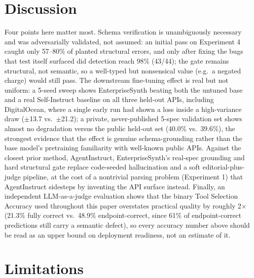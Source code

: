 \documentclass[11pt]{article}
\begin{document}
\section{Discussion}

Four points here matter most. Schema verification is unambiguously necessary and was
adversarially validated, not assumed: an initial pass on Experiment 4 caught only 57--80\% of
planted structural errors, and only after fixing the bugs that test itself surfaced did detection
reach 98\% (43/44); the gate remains structural, not semantic, so a well-typed but nonsensical value
(e.g.\ a negated charge) would still pass. The downstream fine-tuning effect is real but not
uniform: a 5-seed sweep shows EnterpriseSynth beating both the untuned base and a real
Self-Instruct baseline on all three held-out APIs, including DigitalOcean, where a single early
run had shown a loss inside a high-variance draw ($\pm$13.7 vs.\ $\pm$21.2); a private,
never-published 5-spec validation set shows almost no degradation versus the public held-out set
(40.0\% vs.\ 39.6\%), the strongest evidence that the effect is genuine schema-grounding rather
than the base model's pretraining familiarity with well-known public APIs. Against the closest
prior method, AgentInstruct, EnterpriseSynth's real-spec grounding and hard structural gate
replace code-seeded hallucination and a soft editorial-plus-judge pipeline, at the cost of a
nontrivial parsing problem (Experiment 1) that AgentInstruct sidesteps by inventing the API
surface instead. Finally, an independent LLM-as-a-judge evaluation shows that the binary Tool
Selection Accuracy used throughout this paper overstates practical quality by roughly
2$\times$ (21.3\% fully correct vs.\ 48.9\% endpoint-correct, since 61\% of endpoint-correct
predictions still carry a semantic defect), so every accuracy number above should be read as an
upper bound on deployment readiness, not an estimate of it.

\section{Limitations}
\end{document}
